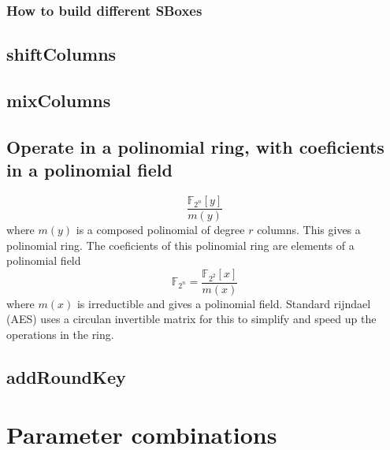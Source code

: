 \documentclass[a4paper,twoside]{llncs}
\newcommand{\Fpn}[2]{\ensuremath{\mathbb{F}_{#1^#2}}}
\newcommand{\Fpnm}[2]{\ensuremath{\frac{\Fpn{2}{#1}[#2]}{m(#2)}}}
\begin{document}
\subsubsection{How to build different SBoxes}

\subsection{shiftColumns}

\subsection{mixColumns}
\subsection{Operate in a polinomial ring, with coeficients in a polinomial field}
$$\Fpnm{n}{y}\label{eq:polinomialRing}$$ where $m(y)$ is a composed polinomial of degree $r$ columns. This gives a polinomial ring. The coeficients of this polinomial ring are elements of a polinomial field $$\Fpn{2}{n}=\Fpnm{2}{x}\label{eq:polinomialField}$$ where $m(x)$ is irreductible and gives a polinomial field.
Standard rijndael (AES) uses a circulan invertible matrix for this to simplify and speed up the operations in the ring.

\subsection{addRoundKey}

\section{Parameter combinations}
\end{document}
